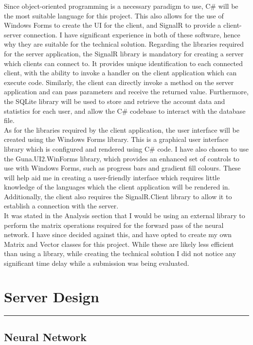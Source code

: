 \documentclass{article}
\newcommand{\hiddensection}[1]{%
  \section*{#1}%
  \addtocontents{toc}{\protect\contentsline{section}{\hspace{1.3em}#1}{}{}}
  \setcounter{subsection}{2}
}
\begin{document}
Since object-oriented programming is a necessary paradigm to use, C\# will be the most suitable language for this project. This also allows for the use of Windows Forms to create the UI for the client, and SignalR to provide a client-server connection. I have significant experience in both of these software, hence why they are suitable for the technical solution. Regarding the libraries required for the server application, the SignalR library is mandatory for creating a server which clients can connect to. It provides unique identification to each connected client, with the ability to invoke a handler on the client application which can execute code. Similarly, the client can directly invoke a method on the server application and can pass parameters and receive the returned value. Furthermore, the SQLite library will be used to store and retrieve the account data and statistics for each user, and allow the C\# codebase to interact with the database file. \\

As for the libraries required by the client application, the user interface will be created using the Windows Forms library. This is a graphical user interface library which is configured and rendered using C\# code. I have also chosen to use the Guna.UI2.WinForms library, which provides an enhanced set of controls to use with Windows Forms, such as progress bars and gradient fill colours. These will help aid me in creating a user-friendly interface which requires little knowledge of the languages which the client application will be rendered in. Additionally, the client also requires the SignalR.Client library to allow it to establish a connection with the server. \\

It was stated in the Analysis section that I would be using an external library to perform the matrix operations required for the forward pass of the neural network. I have since decided against this, and have opted to create my own Matrix and Vector classes for this project. While these are likely less efficient than using a library, while creating the technical solution I did not notice any significant time delay while a submission was being evaluated.

\newpage
\hiddensection{Server Design}
\noindent\rule{\textwidth}{0.2pt}

\subsection{Neural Network}
\end{document}
